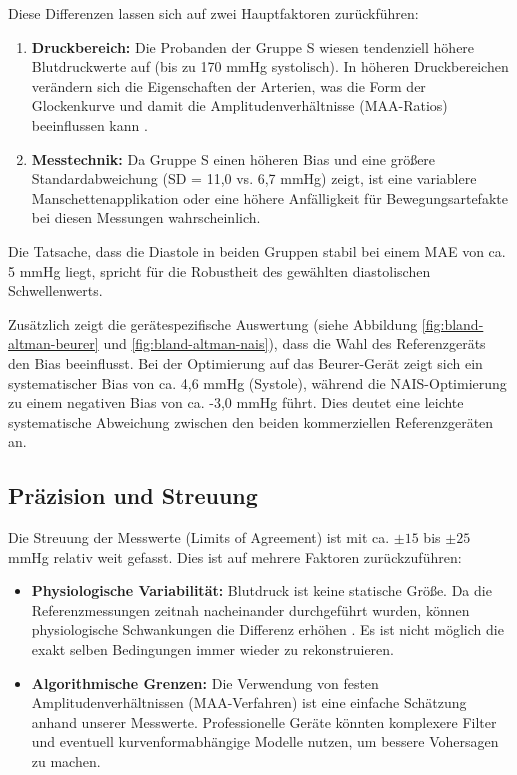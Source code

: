 \documentclass[a4paper, 11pt]{scrartcl}
\begin{document}
Diese Differenzen lassen sich auf zwei Hauptfaktoren zurückführen:
\begin{enumerate}
    \item \textbf{Druckbereich:} Die Probanden der Gruppe S wiesen tendenziell höhere Blutdruckwerte auf (bis zu 170 mmHg systolisch). In höheren Druckbereichen verändern sich die Eigenschaften der Arterien, was die Form der Glockenkurve und damit die Amplitudenverhältnisse (MAA-Ratios) beeinflussen kann \cite{parati2013blood}.
    \item \textbf{Messtechnik:} Da Gruppe S einen höheren Bias und eine größere Standardabweichung (SD = 11,0 vs. 6,7 mmHg) zeigt, ist eine variablere Manschettenapplikation oder eine höhere Anfälligkeit für Bewegungsartefakte bei diesen Messungen wahrscheinlich.
\end{enumerate}

Die Tatsache, dass die Diastole in beiden Gruppen stabil bei einem MAE von ca. 5 mmHg liegt, spricht für die Robustheit des gewählten diastolischen Schwellenwerts.

Zusätzlich zeigt die gerätespezifische Auswertung (siehe Abbildung \ref{fig:bland-altman-beurer} und \ref{fig:bland-altman-nais}), dass die Wahl des Referenzgeräts den Bias beeinflusst. Bei der Optimierung auf das Beurer-Gerät zeigt sich ein systematischer Bias von ca. 4,6 mmHg (Systole), während die NAIS-Optimierung zu einem negativen Bias von ca. -3,0 mmHg führt. Dies deutet eine leichte systematische Abweichung zwischen den beiden kommerziellen Referenzgeräten an.

\subsection{Präzision und Streuung}
Die Streuung der Messwerte (Limits of Agreement) ist mit ca. $\pm 15$ bis $\pm 25$ mmHg relativ weit gefasst. Dies ist auf mehrere Faktoren zurückzuführen:
\begin{itemize}
    \item \textbf{Physiologische Variabilität:} Blutdruck ist keine statische Größe. Da die Referenzmessungen  zeitnah nacheinander durchgeführt wurden, können physiologische Schwankungen die Differenz erhöhen \cite{parati2013blood}. Es ist nicht möglich die exakt selben Bedingungen immer wieder zu rekonstruieren.
    \item \textbf{Algorithmische Grenzen:} Die Verwendung von festen Amplitudenverhältnissen (MAA-Verfahren) ist eine einfache Schätzung anhand unserer Messwerte. Professionelle Geräte könnten komplexere Filter und eventuell kurvenformabhängige Modelle nutzen, um bessere Vohersagen zu machen.
\end{itemize}
\end{document}

